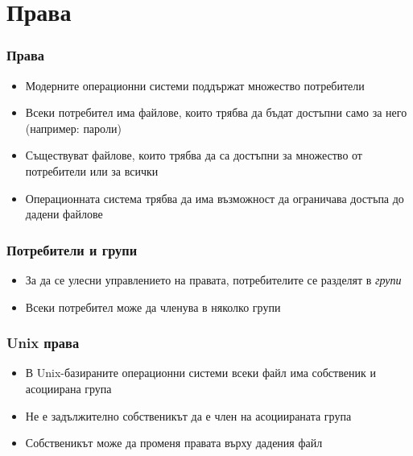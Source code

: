 \documentclass[ignorenonframetext, hyperref=unicode]{beamer}
\begin{document}
\section{Права}

\begin{frame}
\frametitle{Права}
\begin{itemize}
  \item Модерните операционни системи поддържат множество потребители
  \item Всеки потребител има файлове, които трябва да бъдат достъпни само за него (например: пароли)
  \item Съществуват файлове, които трябва да са достъпни за множество от потребители или за всички
  \item Операционната система трябва да има възможност да ограничава достъпа до дадени файлове
\end{itemize}
\end{frame}

\begin{frame}
\frametitle{Потребители и групи}
\begin{itemize}
  \item За да се улесни управлението на правата, потребителите се разделят в {\em групи}
  \item Всеки потребител може да членува в няколко групи
\end{itemize}
\end{frame}

\begin{frame}
\frametitle{Unix права}
\begin{itemize}
  \item В Unix-базираните операционни системи всеки файл има собственик и асоциирана група
  \item Не е задължително собственикът да е член на асоциираната група
  \item Собственикът може да променя правата върху дадения файл
\end{itemize}
\end{frame}
\end{document}
